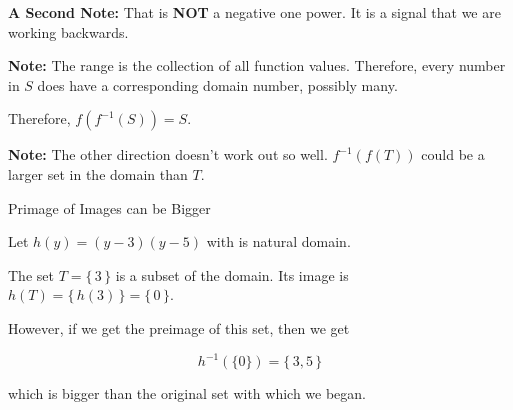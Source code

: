 \documentclass{ximera}
\begin{document}
\textbf{A Second Note:} That is \textbf{NOT} a negative one power.  It is a signal that we are working backwards.

\textbf{Note:}  The range is the collection of all function values. Therefore, every number in $S$ does have a corresponding domain number, possibly many.

Therefore, $f(f^{-1}(S)) = S$.


\textbf{Note:}  The other direction doesn't work out so well. $f^{-1}(f(T))$ could be a larger set in the domain than $T$.



\begin{example} Primage of Images can be Bigger


Let $h(y) = (y-3)(y-5)$ with is natural domain. 

The set $T = \{ \, 3 \, \}$ is a subset of the domain.  Its image is $h(T) = \{ \, h(3) \, \} = \{ \, 0 \, \}$.

However, if we get the preimage of this set, then we get


\[
h^{-1}(\{ 0 \}) = \{ \,  3, 5 \,\}
\]

which is bigger than the original set with which we began.

\end{example}
\end{document}
